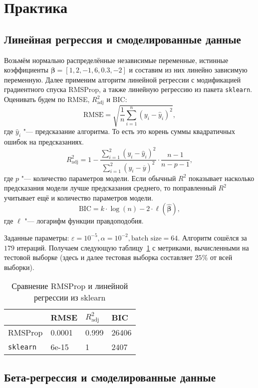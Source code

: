 \documentclass[12pt]{article}
\begin{document}
	\section{Практика}
	
	\subsection{Линейная регрессия и смоделированные данные}
	
	Возьмём нормально распределённые независимые переменные, истинные коэффициенты $\boldsymbol{\beta} = [1, 2, -1, 6, 0.3, -2]$ и составим из них линейно зависимую переменную. Далее применим алгоритм линейной регрессии с модификацией градиентного спуска RMSProp, а также линейную регрессию из пакета \verb|sklearn|. Оценивать будем по RMSE, $R ^2 _{\text{adj}}$ и BIC:
	\[
	\text{RMSE} = \sqrt{\frac 1 n \sum ^n _{i = 1} (y _i - \hat y _i) ^2},
	\]
	где $\hat y _i$ "--- предсказание алгоритма. То есть это корень суммы квадратичных ошибок на предсказаниях.
	\[
	R ^2 _{\text{adj}} = 1  - \frac{\sum ^ 2 _{i = 1} (y _i - \hat y _i) ^2} {\sum ^2 _{i = 1} (y _i - \overline y) ^2} \cdot \frac{n - 1} {n - p - 1},
	\]
	где $p$ "--- количество параметров модели. Если обычный $R ^2$ показывает насколько предсказания модели лучше предсказания среднего, то поправленный $R ^2$ учитывает ещё и количество параметров модели.
 	\[
 	\text{BIC} = k \cdot \log (n) - 2 \cdot \ell (\hat{\boldsymbol{\beta}}),
 	\]
	где $\ell$ "--- логарифм функции правдоподобия.
	
 	Заданные параметры: $\varepsilon = 10 ^{-5}, \alpha = 10 ^{-2}, \text{batch size} = 64$. Алгоритм сошёлся за $179$ итераций. Получаем следующую таблицу~\ref{table1} с метриками, вычисленными  на тестовой выборке (здесь и далее тестовая выборка составляет $25 \%$ от всей выборки).
 	
 	\begin{table}[h]
 		\centering
 		\caption{Сравнение RMSProp и линейной регрессии из sklearn}
 		\begin{tabular}{|l|l|l|l|}
 			\hline
 			& RMSE & $R ^2 _{\text{adj}}$ & BIC \\ \hline
 			RMSProp & 0.0001 & 0.999 & 26406 \\ \hline
 			\verb|sklearn| & 6e-15 & 1 & 2407 \\ \hline
 		\end{tabular}
 		\label{table1}
 	\end{table}
 	
 	\subsection{Бета-регрессия и смоделированные данные}
 	
\end{document}
